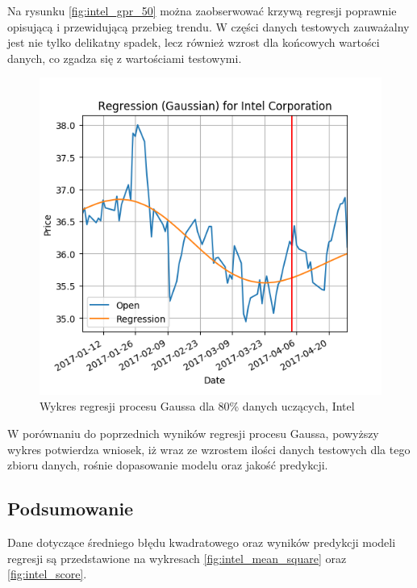 Na rysunku \ref{fig:intel_gpr_50} można zaobserwować krzywą regresji poprawnie opisującą i przewidującą przebieg trendu.
W części danych testowych zauważalny jest nie tylko delikatny spadek, lecz również wzrost dla końcowych wartości danych, co zgadza się z wartościami testowymi.\\

\begin{figure}[h!]
\centering
\includegraphics[width=150mm]{pictures/plots/intel_gpr_80.png}
\caption{Wykres regresji procesu Gaussa dla 80\% danych uczących, Intel}
\label{fig:intel_gpr_80}
\end{figure}

W porównaniu do poprzednich wyników regresji procesu Gaussa, powyższy wykres potwierdza wniosek, iż wraz ze wzrostem ilości danych testowych dla tego zbioru danych, rośnie dopasowanie modelu oraz jakość predykcji.\\

\subsection{Podsumowanie}

Dane dotyczące średniego błędu kwadratowego oraz wyników predykcji modeli regresji są przedstawione na wykresach \ref{fig:intel_mean_square} oraz \ref{fig:intel_score}.\\

